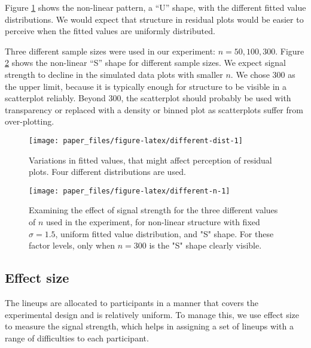 \documentclass[]{interact}
\theoremstyle{plain}%
\theoremstyle{definition}
\theoremstyle{remark}
\begin{document}
Figure \ref{fig:different-dist} shows the non-linear pattern, a ``U''
shape, with the different fitted value distributions. We would expect
that structure in residual plots would be easier to perceive when the
fitted values are uniformly distributed.

Three different sample sizes were used in our experiment:
\(n = 50, 100, 300\). Figure \ref{fig:different-n} shows the non-linear
``S'' shape for different sample sizes. We expect signal strength to
decline in the simulated data plots with smaller \(n\). We chose 300 as
the upper limit, because it is typically enough for structure to be
visible in a scatterplot reliably. Beyond 300, the scatterplot should
probably be used with transparency or replaced with a density or binned
plot as scatterplots suffer from over-plotting.

\begin{figure}

{\centering \texttt{[image: paper\_files/figure-latex/different-dist-1]} 

}

\caption{Variations in fitted values, that might affect perception of residual plots. Four different distributions are used.}\label{fig:different-dist}
\end{figure}

\begin{figure}

{\centering \texttt{[image: paper\_files/figure-latex/different-n-1]} 

}

\caption{Examining the effect of signal strength for the three different values of $n$ used in the experiment, for non-linear structure with fixed $\sigma = 1.5$, uniform fitted value distribution, and "S" shape. For these factor levels, only when $n = 300$ is the "S" shape clearly visible.}\label{fig:different-n}
\end{figure}

\hypertarget{effect-size}{%
\subsection{Effect size}\label{effect-size}}

The lineups are allocated to participants in a manner that covers the
experimental design and is relatively uniform. To manage this, we use
effect size to measure the signal strength, which helps in assigning a
set of lineups with a range of difficulties to each participant.
\end{document}
